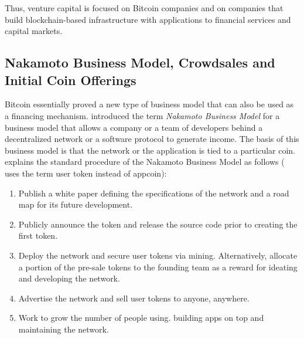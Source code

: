 Thus, venture capital is focused on Bitcoin companies and on companies that build blockchain-based infrastructure with applications to financial services and capital markets.


\subsection{Nakamoto Business Model, Crowdsales and Initial Coin Offerings}
\label{sec:eco:crowdsale}

Bitcoin essentially proved a new type of business model that can also be used as a financing mechanism. \cite{Brener2016} introduced the term \emph{Nakamoto Business Model} for a business model that allows a company or a team of developers behind a decentralized network or a software protocol to generate income. The basis of this business model is that the network or the application is tied to a particular coin. \cite{Brener2016} explains the standard procedure of the Nakamoto Business Model as follows (\cite{Brener2016} uses the term user token instead of appcoin):
\begin{enumerate}
	\item Publish a white paper defining the specifications of the network and a road map for its future development.
	\item Publicly announce the token and release the source code prior to creating the first token.
	\item Deploy the network and secure user tokens via mining. Alternatively, allocate a portion of the pre-sale tokens to the founding team as a reward for ideating and developing the network.
	\item Advertise the network and sell user tokens to anyone, anywhere.
	\item Work to grow the number of people using. building apps on top and maintaining the network.
\end{enumerate}


